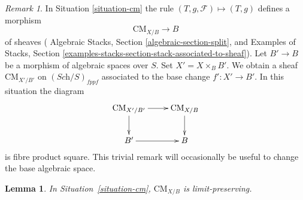 \documentclass{stacks-project}
\theoremstyle{plain}
\newtheorem{lemma}[subsection]{Lemma}
\theoremstyle{definition}
\theoremstyle{remark}
\newtheorem{remark}[subsection]{Remark}
\numberwithin{equation}{subsection}
\def\Sch{\textit{Sch}}
\def\CMfunctor{\mathcal{C}\!{\it oh}}
\def\CMfunctor{\text{CM}}
\begin{document}
\begin{remark}
	\label{remark-cm-base-change}
	In Situation \ref{situation-cm} the rule
$(T, g, \mathcal{F}) \mapsto (T, g)$ defines a morphism
$$
\CMfunctor_{X/B} \longrightarrow B
$$
of sheaves
( Algebraic Stacks, Section \ref{algebraic-section-split}, and
Examples of Stacks, Section
\ref{examples-stacks-section-stack-associated-to-sheaf}).
Let $B' \to B$ be a morphism of
algebraic spaces over $S$.
Set $X' = X \times_B B'$.
We obtain a sheaf $\CMfunctor_{X'/B'}$ on  $(\Sch/S)_{fppf}$
associated to the base change $f' : X' \to B'$. In this situation
the diagram
$$
\vcenter{
\xymatrix{
\CMfunctor_{X'/B'} \ar[r] \ar[d] & \CMfunctor_{X/B} \ar[d] \\
B' \ar[r] & B
}
}
$$
is fibre product square. This trivial remark
will occasionally be useful to change the base algebraic space.
\end{remark}
\begin{lemma}
    In Situation~\ref{situation-cm}, $\CMfunctor_{X/B}$ is limit-preserving.
	\label{lemma-cm-limits}
\end{lemma}
\end{document}
